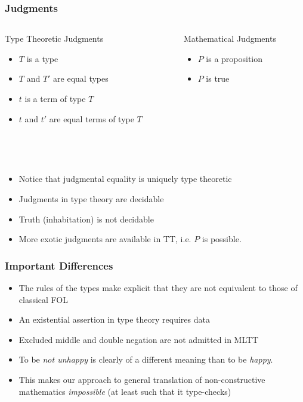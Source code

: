 \documentclass[10pt]{beamer}
\begin{document}
\begin{frame}

\frametitle{Judgments}

\begin{columns}

\begin{column}{0.4 \textwidth}
\begin{block}{Type Theoretic Judgments}
  \begin{itemize}
  \item $T$ is a type
  \item $T$ and $T'$ are equal types
  \item $t$ is a term of type $T$
  \item $t$ and $t'$ are equal terms of type $T$
  \end{itemize}
\end{block}
\end{column}

\begin{column}{0.4 \textwidth}
\begin{block}{Mathematical Judgments}
  \begin{itemize}
  \item $P$ is a proposition
  \item $P$ is true
  \end{itemize}
\end{block}
\end{column}
\end{columns}

\\~\\
\begin{itemize}
  \item Notice that judgmental equality is uniquely type theoretic
  \item Judgments in type theory are decidable
  \item Truth (inhabitation) is not decidable
  \item More exotic judgments are available in TT, i.e. $P$ is possible.
\end{itemize}

\end{frame}


\begin{frame}

\frametitle{Important Differences}

\begin{itemize}
\item The rules of the types make explicit that they are not equivalent to those
  of classical FOL
\item An existential assertion in type theory requires data
\item Excluded middle and double negation are not admitted in MLTT
\item To be \emph{not unhappy} is clearly of a different meaning than to be \emph{happy}.
\item This makes our approach to general translation of non-constructive mathematics \emph{impossible}  (at least such that it type-checks)

\end{itemize}
\end{frame}
\end{document}
